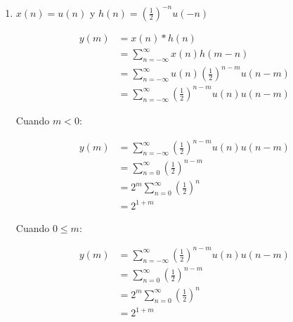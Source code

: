 \documentclass[a4paper,12pt,final]{article}
\begin{document}
\begin{enumerate}[label=\alph*)]
        \item $x\left(n\right) = u\left(n\right)$ y $h\left(n\right) = \left(\frac{1}{2}\right)^{-n} u\left(-n\right)$

          \begin{equation*}
            \begin{split}
              y\left(m\right) & = x\left(n\right) * h\left(n\right) \\
                              & = \sum_{n=-\infty}^{\infty} x\left(n\right)h\left(m-n\right) \\
                              & = \sum_{n=-\infty}^{\infty} u\left(n\right) \left(\frac{1}{2}\right)^{n-m} u\left(n-m\right) \\
                              & = \sum_{n=-\infty}^{\infty} \left(\frac{1}{2}\right)^{n-m} u\left(n\right) u\left(n-m\right)
            \end{split}
          \end{equation*}

          \noindent Cuando $m < 0$:

          \begin{equation*}
            \begin{split}
              y\left(m\right) & = \sum_{n=-\infty}^{\infty} \left(\frac{1}{2}\right)^{n-m} u\left(n\right) u\left(n-m\right) \\
                              & = \sum_{n=0}^{\infty} \left(\frac{1}{2}\right)^{n-m} \\
                              & = 2^{m} \sum_{n=0}^{\infty} \left(\frac{1}{2}\right)^{n} \\
                              & = 2^{1+m}
            \end{split}
          \end{equation*}

          \noindent Cuando $0 \leq m$:

          \begin{equation*}
            \begin{split}
              y\left(m\right) & = \sum_{n=-\infty}^{\infty} \left(\frac{1}{2}\right)^{n-m} u\left(n\right) u\left(n-m\right) \\
                              & = \sum_{n=0}^{\infty} \left(\frac{1}{2}\right)^{n-m} \\
                              & = 2^{m} \sum_{n=0}^{\infty} \left(\frac{1}{2}\right)^{n} \\
                              & = 2^{1+m}
            \end{split}
          \end{equation*}


\end{enumerate}
\end{document}
